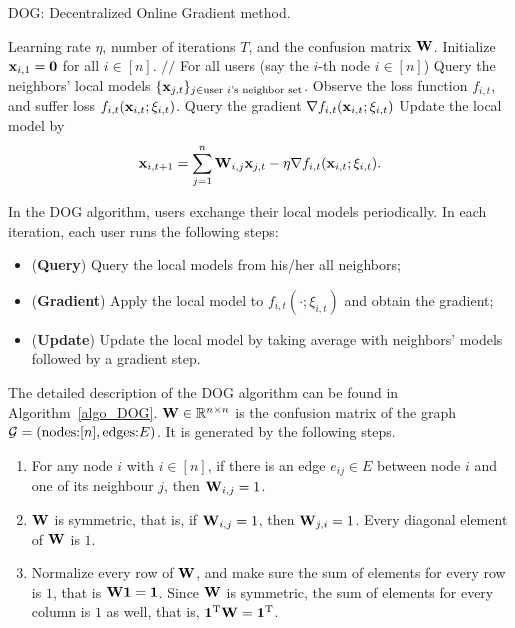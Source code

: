 \documentclass{article}
\begin{document}
\begin{algorithm}[!]
   \caption{\textsc{DOG}: Decentralized Online Gradient method.}
   \label{algo_DOG}
   \begin{algorithmic}[1]
   \REQUIRE Learning rate $\eta$, number of iterations $T$, and the confusion matrix ${\bf W}$.    
  \STATE Initialize ${\bf x}_{i,1} = {\bf 0}$ for all $i\in [n]$.    
            \STATE $\slash\slash$ For all users (say the $i$-th node $i\in[n]$)
                        \STATE \indent Query the neighbors' local models $\{{\bf x}_{j,t}\}_{j\in \text{user $i$'s neighbor set}}$.
            \STATE \indent Observe the loss function $f_{i,t}$, and suffer loss $f_{i,t}({\bf x}_{i,t};\xi_{i,t})$.
            \STATE \indent Query the gradient $\nabla f_{i,t}({\bf x}_{i,t};\xi_{i,t})$
            \STATE \indent Update the local model by 
            \[{\bf x}_{i,t+1} = \sum_{j=1}^n {\bf W}_{i,j}{\bf x}_{j,t} - \eta \nabla f_{i,t}({\bf x}_{i,t};\xi_{i,t}).\] 
       \ENDFOR
   \end{algorithmic}
\end{algorithm}

In the DOG algorithm, users exchange their local models periodically. In each iteration, each user runs the following steps:
\begin{itemize}
\item ({\bf Query}) Query the local models from his/her all neighbors;
\item ({\bf Gradient}) Apply the local model to $f_{i,t}(\cdot; \xi_{i,t})$ and obtain the gradient;
\item ({\bf Update}) Update the local model by taking average with neighbors' models followed by a gradient step.
\end{itemize}
The detailed description of the DOG algorithm can be found in Algorithm~\ref{algo_DOG}.   ${\bf W}\in\mathbb{R}^{n\times n}$ is the confusion matrix of the graph ${\mathcal{G}}=(\text{nodes:} [n], \text{edges:} E)$. It is generated by the following steps.
\begin{enumerate}
\item For any node $i$ with $i\in[n]$, if there is an edge $e_{ij}\in E$ between node $i$ and one of its neighbour $j$, then ${\bf W}_{i,j} = 1$.
\item ${\bf W}$ is symmetric, that is, if ${\bf W}_{i,j} = 1$, then ${\bf W}_{j,i} = 1$. Every diagonal element of ${\bf W}$ is $1$.
\item Normalize every row of ${\bf W}$, and make sure the sum of elements for every row is $1$, that is ${\bf W}{\bf 1} = {\bf 1}$. Since ${\bf W}$ is symmetric, the sum of elements for every column is $1$ as well, that is, ${\bf 1}^{\rm T}{\bf W} = {\bf 1}^{\rm T}$.
\end{enumerate}
\end{document}
